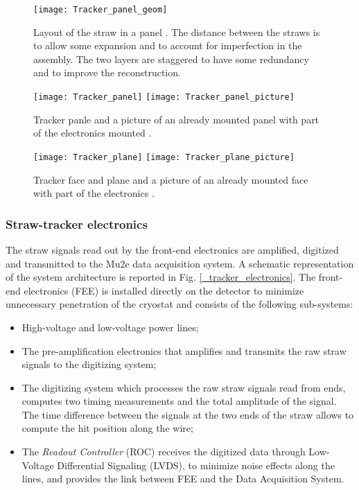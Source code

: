 \documentclass[12pt,a4paper,openright, oneside, titlepage]{book} %
\begin{document}
\begin{figure}[h!]
\centering
\texttt{[image: Tracker\_panel\_geom]}
\caption{Layout of the straw in a panel \cite{MTDR}. The distance between the straws is to allow some expansion and to account for imperfection in the assembly. The two layers are staggered to have some redundancy and to improve the reconstruction.}
\label{_Tracker_panel_geom}
\end{figure}

\begin{figure}[h!]
\centering
\texttt{[image: Tracker\_panel]}
\texttt{[image: Tracker\_panel\_picture]}
\caption{Tracker panle \cite{MTDR} and a picture of an already mounted panel with part of the electronics mounted \cite{Manolis}.}
\label{_Tracker_panel}
\end{figure}

\begin{figure}[h!]
\centering
\texttt{[image: Tracker\_plane]}
\texttt{[image: Tracker\_plane\_picture]}
\caption{Tracker face and plane \cite{MTDR} and a picture of an already mounted face with part of the electronics \cite{Manolis}.}
\label{_Tracker_plane}
\end{figure}


\subsubsection{Straw-tracker electronics}
The straw signals read out by the front-end electronics are amplified, 
digitized and transmitted to the Mu2e data acquisition system.
A schematic representation of the system architecture is reported
in Fig. \ref{_tracker_electronics}.
The front-end electronics (FEE) is installed directly on the detector 
to minimize unnecessary penetration of the cryostat and consists 
of the following sub-systems:
\begin{itemize}
\item High-voltage and low-voltage power lines;
\item The pre-amplification electronics that amplifies and transmits the raw straw signals to the digitizing system;
\item The digitizing system which processes the raw straw signals read from ends,  
computes two timing measurements and the total amplitude of the signal. 
The time difference between the signals at the two ends of the straw allows to compute the hit position along the 
wire;
\item The {\em Readout Controller} (ROC) receives the digitized data 
through Low-Voltage Differential Signaling (LVDS), to  minimize noise effects along the lines,
and provides the link between FEE and the Data Acquisition System.
\end{itemize}
\end{document}
